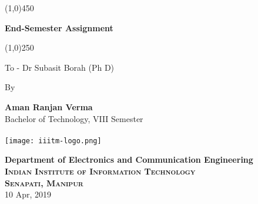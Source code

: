 \thispagestyle{empty}
\begin{center}

\vspace*{0.7 cm}
\begin{center}
	\begin{center}
	\color{lightgray}
		\line(1,0){450}\\
	\end{center}
	\vspace{0.3 in}
	{\huge{\bf End-Semester Assignment}}
	\begin{center}
		\color{lightgray}
		\line(1,0){250}\\
	\end{center}
\end{center}
{\en To - Dr Subasit Borah (Ph D)}

By
			       
{\Large \bf Aman Ranjan Verma\\}
{\en Bachelor of Technology, VIII Semester\\}
{}\\

\vspace{1.5 in}
\vspace{0.8 in}
\texttt{[image: iiitm-logo.png]}
\vspace{0.8 in}

{\large\bf Department of Electronics and Communication Engineering\\}
\textsc{\large\bf Indian Institute of Information Technology\\ Senapati, Manipur}\\
{\large 10 Apr, 2019 }

\end{center}

